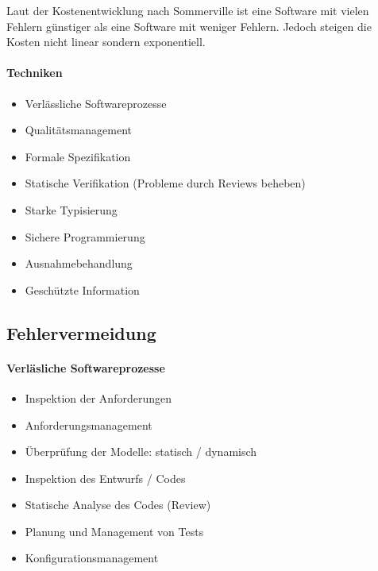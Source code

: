 Laut der Kostenentwicklung nach Sommerville ist eine Software mit vielen Fehlern günstiger als eine Software mit weniger Fehlern. Jedoch steigen die Kosten nicht linear sondern exponentiell.

\paragraph{Techniken}
\begin{itemize}
\item Verlässliche Softwareprozesse
\item Qualitätsmanagement
\item Formale Spezifikation
\item Statische Verifikation (Probleme durch Reviews beheben)
\item Starke Typisierung
\item Sichere Programmierung
\item Ausnahmebehandlung
\item Geschützte Information
\end{itemize}

\subsection{Fehlervermeidung}
\paragraph{Verläsliche Softwareprozesse}

\begin{itemize}
\item Inspektion der Anforderungen
\item Anforderungsmanagement
\item Überprüfung der Modelle: statisch / dynamisch
\item Inspektion des Entwurfs / Codes
\item Statische Analyse des Codes (Review)
\item Planung und Management von Tests
\item Konfigurationsmanagement
\end{itemize}

